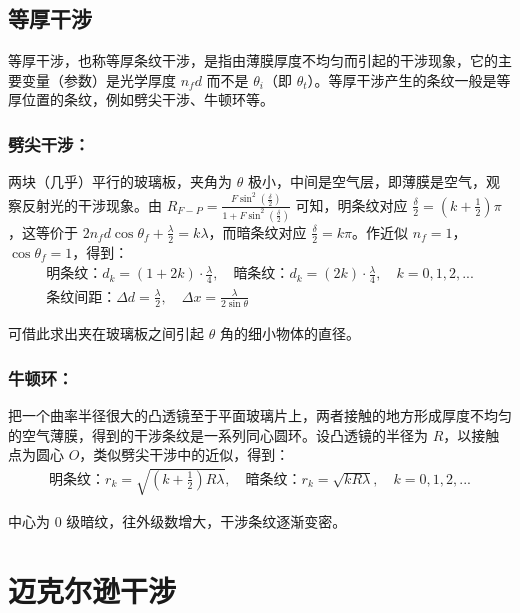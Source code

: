 \documentclass[UTF8]{report}
\theoremstyle{MyLineTheoremStyle} %
\theoremstyle{MyBlockTheoremStyle} %
\theoremstyle{MySubsubsectionStyle} %
\begin{document}
\subsection{等厚干涉} 

等厚干涉，也称等厚条纹干涉，是指由薄膜厚度不均匀而引起的干涉现象，它的主要变量（参数）是光学厚度 $n_f d$ 而不是 $\theta_i$（即 $\theta_t$）。等厚干涉产生的条纹一般是等厚位置的条纹，例如劈尖干涉、牛顿环等。

\subsubsection{劈尖干涉：}

两块（几乎）平行的玻璃板，夹角为 $\theta$ 极小，中间是空气层，即薄膜是空气，观察反射光的干涉现象。由 $R_{F-P} = \frac{ F \sin^2 (\frac{\delta}{2}) }{1 + F \sin^2 (\frac{\delta}{2})}$ 可知，明条纹对应 $\frac{\delta}{2} = (k + \frac{1}{2}) \pi$，这等价于 $2 n_f d\cos \theta_f + \frac{\lambda}{2} = k\lambda$，而暗条纹对应 $\frac{\delta}{2} = k \pi$。作近似 $n_f = 1$，$\cos \theta_f = 1$，得到：
\begin{gather}
    \text{明条纹：} d_k = \left( 1 + 2k \right)\cdot \frac{\lambda}{4},\quad \text{暗条纹：} d_k = \left( 2k \right)\cdot \frac{\lambda}{4},\quad k = 0, 1, 2, ... \\ 
    \text{条纹间距：}\Delta d = \frac{\lambda}{2},\quad \Delta x = \frac{\lambda}{2\sin \theta}
\end{gather}


可借此求出夹在玻璃板之间引起 $\theta$ 角的细小物体的直径。

\subsubsection{牛顿环：}

把一个曲率半径很大的凸透镜至于平面玻璃片上，两者接触的地方形成厚度不均匀的空气薄膜，得到的干涉条纹是一系列同心圆环。设凸透镜的半径为 $R$，以接触点为圆心 $O$，类似劈尖干涉中的近似，得到：
\begin{gather}
\text{明条纹：} r_k = \sqrt{\left(k + \frac{1}{2}\right)R\lambda} 
,\quad 
\text{暗条纹：} r_k = \sqrt{kR\lambda},\quad k = 0, 1, 2, ... 
\end{gather}

中心为 0 级暗纹，往外级数增大，干涉条纹逐渐变密。


\section{迈克尔逊干涉}
\end{document}
